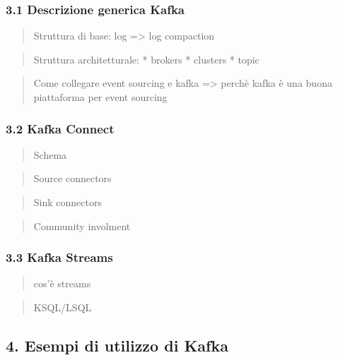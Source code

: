 \documentclass[]{article}
\begin{document}
\subsubsection{3.1 Descrizione generica
Kafka}\label{descrizione-generica-kafka}

\begin{quote}
Struttura di base: log =\textgreater{} log compaction
\end{quote}

\begin{quote}
Struttura architetturale: * brokers * clusters * topic
\end{quote}

\begin{quote}
Come collegare event sourcing e kafka =\textgreater{} perchè kafka è una
buona piattaforma per event sourcing
\end{quote}

\subsubsection{3.2 Kafka Connect}\label{kafka-connect}

\begin{quote}
Schema
\end{quote}

\begin{quote}
Source connectors
\end{quote}

\begin{quote}
Sink connectors
\end{quote}

\begin{quote}
Community involment
\end{quote}

\subsubsection{3.3 Kafka Streams}\label{kafka-streams}

\begin{quote}
cos'è streams
\end{quote}

\begin{quote}
KSQL/LSQL
\end{quote}

\subsection{4. Esempi di utilizzo di
Kafka}\label{esempi-di-utilizzo-di-kafka}
\end{document}
